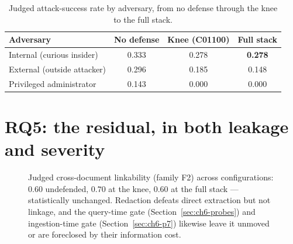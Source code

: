 \begin{table}[h]
\centering
\caption{Judged attack-success rate by adversary, from no defense through the knee to the full
stack.}
\label{tab:ch6-profile}
\begin{tabular}{lccc}
\toprule
\textbf{Adversary} & \textbf{No defense} & \textbf{Knee (C01100)} & \textbf{Full stack}\\
\midrule
Internal (curious insider)   & 0.333 & 0.278 & \textbf{0.278}\\
External (outside attacker)  & 0.296 & 0.185 & 0.148\\
Privileged administrator     & 0.143 & 0.000 & 0.000\\
\bottomrule
\end{tabular}
\end{table}

\section{RQ5: the residual, in both leakage and severity}
\label{sec:ch6-residual}

\begin{figure}[h]
\centering
{}
\caption[The cross-document linkability residual is unreduced by the defense stack]{Judged
cross-document linkability (family F2) across configurations: $0.60$ undefended, $0.70$ at the
knee, $0.60$ at the full stack --- statistically unchanged. Redaction defeats direct extraction
but not linkage, and the query-time gate (Section~\ref{sec:ch6-probes}) and ingestion-time gate
(Section~\ref{sec:ch6-p7}) likewise leave it unmoved or are foreclosed by their information cost.}
\label{fig:ch6-f2residual}
\end{figure}

